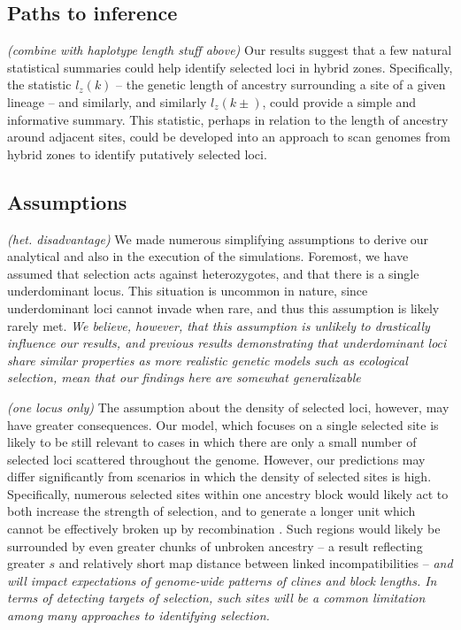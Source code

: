 \documentclass[11pt,letterpaper]{article}
\newcommand{\alisa}[1]{{\em \color{red} #1}}
\newcommand{\plr}[1]{{\em \color{blue} #1}}
\begin{document}
\subsection*{Paths to inference}

\plr{(combine with haplotype length stuff above)}
Our results suggest that a few natural statistical summaries could help identify selected loci in hybrid zones. 
Specifically, the statistic $l_z(k)$ -- the genetic length of ancestry surrounding a site of a given lineage -- and similarly,  and similarly $l_z(k\pm)$, could provide a simple and informative summary. 
This statistic, perhaps in relation to the length of ancestry around adjacent sites, could be developed into an approach to scan genomes from hybrid zones to identify putatively selected loci. 

\subsection*{Assumptions}

\plr{(het. disadvantage)}
We made numerous simplifying assumptions to derive our analytical and also in the execution of the simulations. %
Foremost, we have assumed that selection acts against heterozygotes, and that there is a single underdominant locus. This situation is uncommon in nature, since underdominant loci cannot invade when rare, and thus this assumption is likely rarely met. \alisa{We believe, however, that this assumption is unlikely to drastically influence our results, and previous results demonstrating that underdominant loci share similar properties as more realistic genetic models such as ecological selection, mean that our findings here are somewhat generalizable} \citep{Barton1989, Barton1993}

\plr{(one locus only)}
The assumption about the density of selected loci, however, may have greater consequences. Our model, which focuses on a single selected site is likely to be still relevant to cases in which there are only a small number of selected loci scattered throughout the genome. However, our predictions may differ significantly from scenarios in which the density of selected sites is high. Specifically, numerous selected sites within one ancestry block would likely act to both  increase the strength of selection, and to generate a longer unit which cannot be effectively broken up by recombination   \citep{Barton1983,Kruuk1999}. Such regions would likely be surrounded by even greater chunks of unbroken ancestry -- a result reflecting  greater $s$ and relatively short map distance between linked incompatibilities -- \alisa{and will impact expectations of genome-wide patterns of clines and block lengths. In terms of detecting targets of selection, such sites will be a common limitation among many approaches to identifying selection.}
\end{document}
